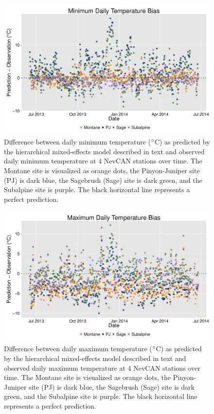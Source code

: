 \documentclass{ametsoc}
\begin{document}
\begin{figure}[ht]

\centerline{\includegraphics[width=39pc]{figure07_tmn-validation.pdf}}

\caption{Difference between daily minimum temperature ($\degree$C) as predicted by the hierarchical mixed-effects model described in text and observed daily minimum temperature at 4 NevCAN stations over time. The Montane site is visualized as orange dots, the Pinyon-Juniper site (PJ) is dark blue, the Sagebrush (Sage) site is dark green, and the Subalpine site is purple. The black horizontal line represents a perfect prediction.\label{fig:7}}

\end{figure}


\begin{figure}[ht]

\centerline{\includegraphics[width=39pc]{figure08_tmx-validation.pdf}}

\caption{Difference between daily maximum temperature ($\degree$C) as predicted by the hierarchical mixed-effects model described in text and observed daily maximum temperature at 4 NevCAN stations over time. The Montane site is visualized as orange dots, the Pinyon-Juniper site (PJ) is dark blue, the Sagebrush (Sage) site is dark green, and the Subalpine site is purple. The black horizontal line represents a perfect prediction.\label{fig:8}}

\end{figure}
\end{document}
